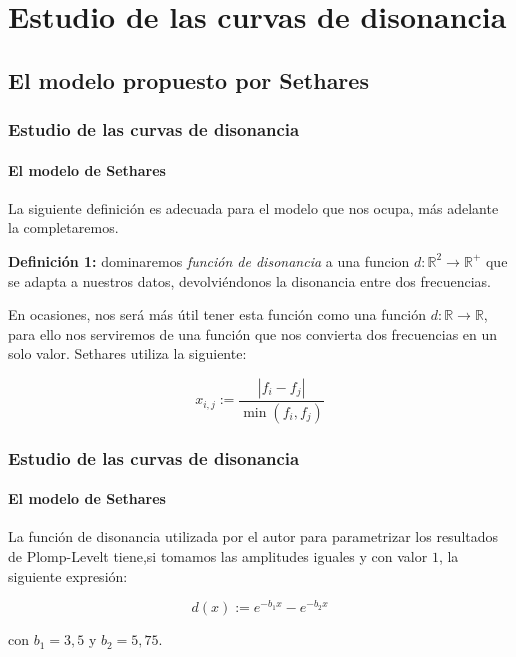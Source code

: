 \documentclass[12 pt]{beamer}
\begin{document}
\section{Estudio de las curvas de disonancia}

\subsection{El modelo propuesto por Sethares} 

\begin{frame}{15}
    \frametitle{Estudio de las curvas de disonancia}
    
    \framesubtitle{El modelo de Sethares}
    
    La siguiente definición es adecuada para el modelo que nos ocupa, más adelante la completaremos.
    
    \textbf{Definición 1:} dominaremos \emph{función de disonancia} a una funcion $d: \mathbb{R}^2 \rightarrow \mathbb{R}^{+}$ que se adapta a nuestros datos, devolviéndonos la disonancia entre dos frecuencias.
    
    En ocasiones, nos será más útil tener esta función como una función $d: \mathbb{R} \rightarrow \mathbb{R}$, para ello nos serviremos de una función que nos convierta dos frecuencias en un solo valor. Sethares utiliza la siguiente:
    
    \begin{equation*}
        x_{i,j} := \frac{|f_i - f_j|}{\min{ (f_i, f_j)} }
    \end{equation*}
    
\end{frame}

\begin{frame}{16}
 
    \frametitle{Estudio de las curvas de disonancia}
    
    \framesubtitle{El modelo de Sethares}
    
    La función de disonancia utilizada por el autor para parametrizar los resultados de  Plomp-Levelt tiene,si tomamos las amplitudes iguales y con valor $1$, la siguiente expresión:
    
    \begin{equation*}
        \boxed{
            d(x) := e^{-b_1 x} - e^{-b_2 x}
        }
    \end{equation*}
    
    con $b_1 = 3,5$ y $b_2 = 5,75$.
    
    
\end{frame}
\end{document}
